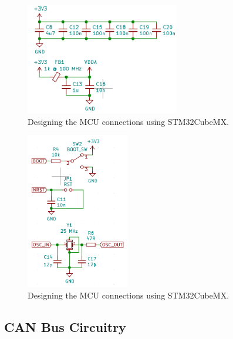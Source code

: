 \begin{figure}[H]
    \centering
    \includegraphics[width=0.6\textwidth]{obrazky/schem_mcu_power_filter}
    \caption{Designing the MCU connections using STM32CubeMX.}
    \label{fig:schem_mcu_power}
\end{figure}


\begin{figure}[H]
    \centering
    \includegraphics[width=0.4\textwidth]{obrazky/schem_mcu_aux}
    \caption{Designing the MCU connections using STM32CubeMX.}
    \label{fig:schem_mcu_aux}
\end{figure}

\subsection{CAN Bus Circuitry}
\label{subsec:can_circuitry}

